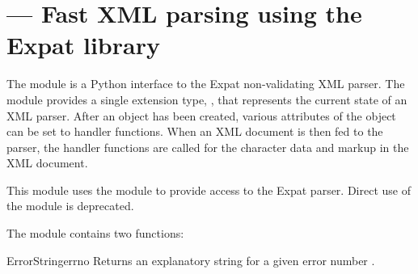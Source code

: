 \section{ ---
         Fast XML parsing using the Expat library}



The  module is a Python interface to the Expat
non-validating XML parser.
The module provides a single extension type, , that
represents the current state of an XML parser.  After an
 object has been created, various attributes of the object 
can be set to handler functions.  When an XML document is then fed to
the parser, the handler functions are called for the character data
and markup in the XML document.

This module uses the  module to
provide access to the Expat parser.  Direct use of the
 module is deprecated.
 
The  module contains two functions:

\begin{funcdesc}{ErrorString}{errno}
Returns an explanatory string for a given error number .
\end{funcdesc}

